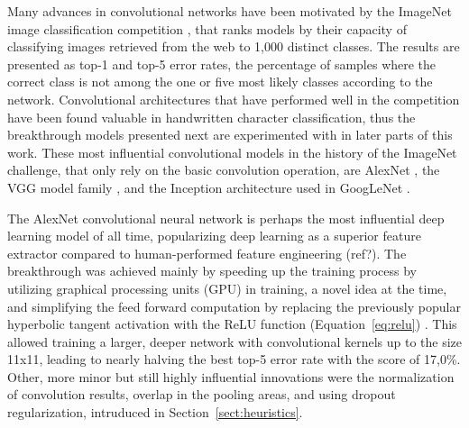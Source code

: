 \documentclass{article}
\begin{document}
Many advances in convolutional networks have been motivated by the ImageNet image classification competition \cite{imagenet},
 that ranks models by their capacity of classifying images retrieved from the web to 1,000 distinct classes.
 The results are presented as top-1 and top-5 error rates, the percentage of samples 
where the correct class is not among the one or five most likely classes according to the network. Convolutional architectures
that have performed well in the competition have been found valuable in handwritten character classification, thus the 
breakthrough models presented next are experimented with in later parts of this work.
These most influential convolutional models in the history of the ImageNet challenge,  that
only rely on the basic convolution operation, are AlexNet \cite{alexnet}, 
the VGG model family \cite{vgg}, and
the Inception architecture used in GoogLeNet \cite{googlelenet}.

The AlexNet convolutional neural network is perhaps the most influential deep learning model of all time, 
popularizing deep learning as a superior feature extractor compared to human-performed feature engineering (ref?).
The breakthrough was achieved mainly by speeding up the training process by utilizing graphical processing units (GPU)
in training, a novel idea at the time, and simplifying the feed forward computation by replacing the previously popular 
hyperbolic tangent activation with the ReLU function (Equation~\ref{eq:relu}) \cite{alexnet}.
 This allowed training a larger, deeper network
with convolutional kernels up to the size 11x11, leading to nearly halving the best top-5 error rate with the score of
17,0\%. Other, more minor but still highly influential innovations were the normalization of convolution results, 
overlap in the pooling areas, and using dropout regularization, intruduced in Section~\ref{sect:heuristics}.
\end{document}
